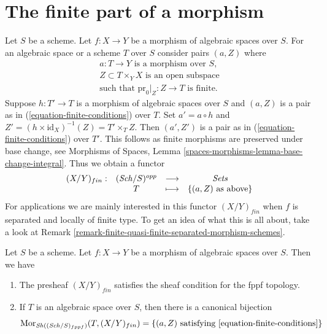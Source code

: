 \section{The finite part of a morphism}
\label{section-finite}

\noindent
Let $S$ be a scheme.
Let $f : X \to Y$ be a morphism of algebraic spaces over $S$.
For an algebraic space or a scheme $T$ over $S$ consider pairs
$(a, Z)$ where
\begin{equation}
\label{equation-finite-conditions}
\begin{matrix}
a : T \to Y\text{ is a morphism over }S, \\
Z \subset T \times_Y X\text{ is an open subspace} \\
\text{such that }\text{pr}_0|_Z : Z \to T\text{ is finite.}
\end{matrix}
\end{equation}
Suppose $h : T' \to T$ is a morphism of algebraic spaces over $S$
and $(a, Z)$ is a pair as in (\ref{equation-finite-conditions}) over $T$. Set
$a' = a \circ h$ and $Z' = (h \times \text{id}_X)^{-1}(Z) = T' \times_T Z$.
Then $(a', Z')$ is a pair as in (\ref{equation-finite-conditions}) over $T'$.
This follows as finite morphisms are preserved under base change, see
Morphisms of Spaces, Lemma \ref{spaces-morphisms-lemma-base-change-integral}.
Thus we obtain a functor
\begin{equation}
\label{equation-finite}
\begin{matrix}
(X/Y)_{fin} : &
(\mathit{Sch}/S)^{opp} &
\longrightarrow &
\textit{Sets} \\
& T & \longmapsto &
\{(a, Z)\text{ as above}\}
\end{matrix}
\end{equation}
For applications we are mainly interested in this functor $(X/Y)_{fin}$
when $f$ is separated and locally of finite type. To get an idea
of what this is all about, take a look at
Remark \ref{remark-finite-quasi-finite-separated-morphism-schemes}.

\begin{lemma}
\label{lemma-finite-sheaf}
Let $S$ be a scheme.
Let $f : X \to Y$ be a morphism of algebraic spaces over $S$.
Then we have
\begin{enumerate}
\item The presheaf $(X/Y)_{fin}$ satisfies the sheaf condition for
the fppf topology.
\item If $T$ is an algebraic space over $S$, then there is a
canonical bijection
$$
\mathop{\mathrm{Mor}}\nolimits_{\mathop{\mathit{Sh}}\nolimits((\mathit{Sch}/S)_{fppf})}(T, (X/Y)_{fin})
=
\{(a, Z)\text{ satisfying \ref{equation-finite-conditions}}\}
$$
\end{enumerate}
\end{lemma}

